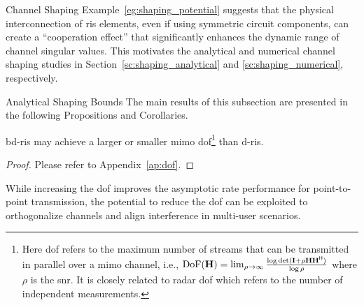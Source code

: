 \documentclass[journal]{IEEEtran}
\begin{document}
\begin{section}{Channel Shaping}
	Example~\ref{eg:shaping_potential} suggests that the physical interconnection of \gls{ris} elements, even if using symmetric circuit components, can create a ``cooperation effect'' that significantly enhances the dynamic range of channel singular values.
	This motivates the analytical and numerical channel shaping studies in Section~\ref{sc:shaping_analytical} and \ref{sc:shaping_numerical}, respectively.

	\begin{subsection}{Analytical Shaping Bounds}
		\label{sc:shaping_analytical}
		The main results of this subsection are presented in the following Propositions and Corollaries.
		\begin{proposition}
			\label{pp:dof}
			\gls{bd}-\gls{ris} may achieve a larger or smaller \gls{mimo} \gls{dof}\footnote{Here \gls{dof} refers to the maximum number of streams that can be transmitted in parallel over a \gls{mimo} channel, i.e., $\textnormal{DoF}(\mathbf{H}) = \lim_{\rho \to \infty} \frac{\log \det(\mathbf{I} + \rho \mathbf{H} \mathbf{H}^\mathsf{H})}{\log \rho}$ where $\rho$ is the \gls{snr}. It is closely related to radar \gls{dof} which refers to the number of independent measurements.} than \gls{d}-\gls{ris}.
		\end{proposition}
		\begin{proof}
			Please refer to Appendix~\ref{ap:dof}.
		\end{proof}

		While increasing the \gls{dof} improves the asymptotic rate performance for point-to-point transmission, the potential to reduce the \gls{dof} can be exploited to orthogonalize channels and align interference in multi-user scenarios.


\end{subsection}
\end{section}
\end{document}
